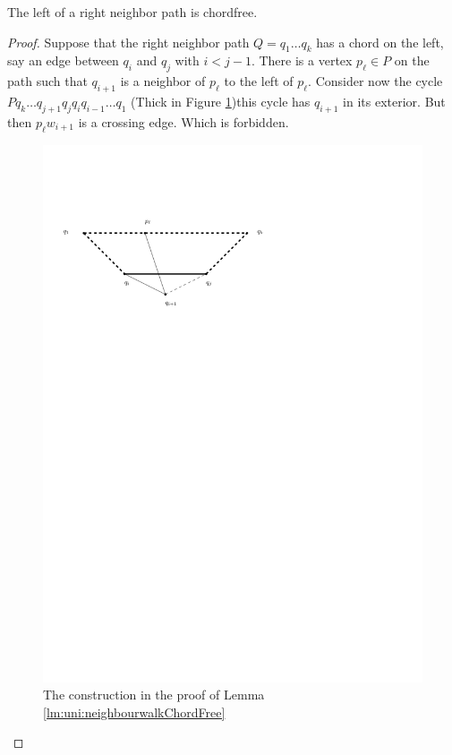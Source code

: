   \begin{lemma}
    \label{lm:uni:neighbourwalkChordFree}
    The left of a right neighbor path is chordfree.
  \end{lemma}
  \begin{proof}
    Suppose that the right neighbor path $Q = q_1 \ldots q_k$  has a chord on the left, say an edge between $q_i$ and $q_j$ with $i< j -1 $. There is a vertex $p_\ell \in P$ on the path such that $q_{i+1}$ is a neighbor of $p_\ell$ to the left of $p_\ell$. Consider now the cycle $P q_k \ldots q_{j+1} q_j q_i q_{i-1} \ldots q_1$
    (Thick in Figure \ref{fig:uni:neihbourwalkChordFree})this cycle has $q_{i+1}$ in its exterior. But then $p_\ell w_{i+1}$ is a crossing edge. Which is forbidden.

    \begin{figure}[h]
      \centering
      \includegraphics[scale=1]{unifiedAlgo/img/neighbourWalkChords}
      \caption{The construction in the proof of Lemma \ref{lm:uni:neighbourwalkChordFree}}
      \label{fig:uni:neihbourwalkChordFree}
    \end{figure}
  \end{proof}
